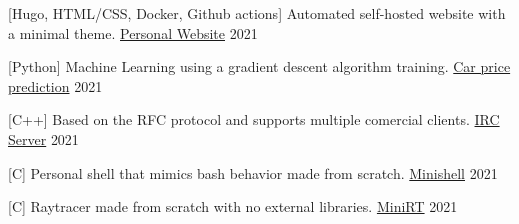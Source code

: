 
\begin{cventries}

  \cventry
    {[Hugo, HTML/CSS, Docker, Github actions] Automated self-hosted website with a minimal theme.}
    {\href{https://github.com/pruiz-ca/pedroruiz.xyz}{Personal Website}}
    {}
    {2021}
    {}

  \cventry
    {[Python] Machine Learning using a gradient descent algorithm training.}
    {\href{https://github.com/pruiz-ca/ft_linear_regression}{Car price prediction}}
    {}
    {2021}
    {}

  \cventry
    {[C++] Based on the RFC protocol and supports multiple comercial clients.}
    {\href{https://github.com/pruiz-ca/ft_irc}{IRC Server}}
    {}
    {2021}
    {}


  \cventry
    {[C] Personal shell that mimics bash behavior made from scratch.}
    {\href{https://github.com/pruiz-ca/minishell}{Minishell}}
    {}
    {2021}
    {}

  \cventry
    {[C] Raytracer made from scratch with no external libraries.}
    {\href{https://github.com/pruiz-ca/miniRT}{MiniRT}}
    {}
    {2021}
    {}

\end{cventries}
